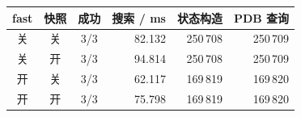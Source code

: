 \begin{tabular}{cccrrr}
\toprule
\textbf{fast} & \textbf{快照} & \textbf{成功} & \textbf{搜索 / ms} & \textbf{状态构造} & \textbf{PDB 查询} \\
\midrule
关 & 关 & 3/3 & 82.132 & 250\,708 & 250\,709 \\
关 & 开 & 3/3 & 94.814 & 250\,708 & 250\,709 \\
开 & 关 & 3/3 & 62.117 & 169\,819 & 169\,820 \\
开 & 开 & 3/3 & 75.798 & 169\,819 & 169\,820 \\
\bottomrule
\end{tabular}
